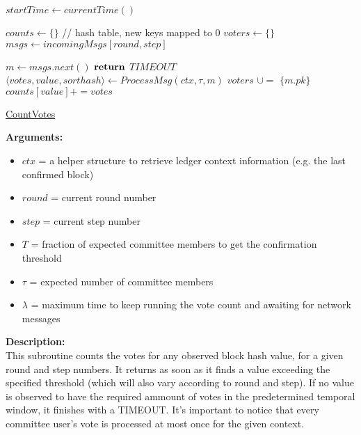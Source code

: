 \documentclass[10pt,a4paper]{article}
\begin{document}
\begin{algorithm}
    \begin{algorithmic}[H]

    \State $startTime \gets currentTime()$

    \State $counts \gets \{\}$ // hash table, new keys mapped to 0
    \State $voters \gets \{\}$
    \State $msgs \gets incomingMsgs[round,step]$

        \State $m \gets msgs.next()$
                \State $\Return$ $TIMEOUT$
            \EndIf
        \Else
            \State $ \langle votes, value, sorthash \rangle \gets ProcessMsg(ctx, \tau, m)$
            \State $voters$ $\cup=$ $\{m.pk\}$
            \State $counts[value] += votes$
        \EndIf
    \EndWhile
    \EndFunction
    \end{algorithmic}
    \caption{\underline{CountVotes}}
\end{algorithm}

\noindent \textbf{Arguments:}
\begin{itemize}
    \item $ctx$ = a helper structure to retrieve ledger context information (e.g. the last confirmed block)
    \item $round$ = current round number
    \item $step$ = current step number
    \item $T$ = fraction of expected committee members to get the confirmation threshold
    \item $\tau$ = expected number of committee members
    \item $\lambda$ = maximum time to keep running the vote count and awaiting for network messages
  \end{itemize}

\noindent \textbf{Description:}\\
This subroutine counts the votes for any observed block hash value, for a given round and step numbers.
It returns as soon as it finds a value exceeding the specified threshold (which will also vary according to round and step).
If no value is observed to have the required ammount of votes in the predetermined temporal window, it finishes with a TIMEOUT.
It's important to notice that every committee user's vote is processed at most once for the given context.\\
\end{document}
